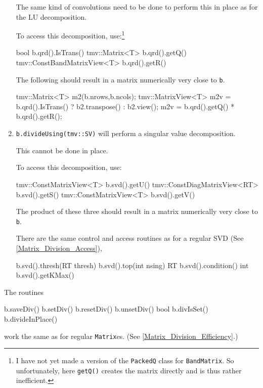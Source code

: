 \documentclass[twoside,letterpaper,11pt]{article}
\renewcommand{\tt}[1]{{\lstinline {#1}}}
\begin{document}
\begin{enumerate}
The same kind of convolutions need to be done to perform this in place as 
for the LU decomposition.

To access this decomposition, use:\footnote{
I have not yet made a version of the \tt{PackedQ} class for \tt{BandMatrix}.
So unfortunately, here \tt{getQ()} creates the matrix directly and is thus
rather inefficient.}
\begin{tmvcode}
bool b.qrd().IsTrans()
tmv::Matrix<T> b.qrd().getQ()
tmv::ConstBandMatrixView<T> b.qrd().getR()
\end{tmvcode}
The following should result in a matrix numerically very close to \tt{b}.
\begin{tmvcode}
tmv::Matrix<T> m2(b.nrows,b.ncols);
tmv::MatrixView<T> m2v = 
      b.qrd().IsTrans() ? b2.transpose() : b2.view();
m2v = b.qrd().getQ() * b.qrd().getR();
\end{tmvcode}

\item
\tt{b.divideUsing(tmv::SV)} will perform a singular value decomposition.

This cannot be done in place.

To access this decomposition, use:
\begin{tmvcode}
tmv::ConstMatrixView<T> b.svd().getU()
tmv::ConstDiagMatrixView<RT> b.svd().getS()
tmv::ConstMatrixView<T> b.svd().getV()
\end{tmvcode}
The product of these three
should result in a matrix numerically very close to \tt{b}.

There are the same control and access routines as for a regular SVD
(See \ref{Matrix_Division_Access}),
\begin{tmvcode}
b.svd().thresh(RT thresh)
b.svd().top(int nsing)
RT b.svd().condition()
int b.svd().getKMax()
\end{tmvcode}

\end{enumerate}
The routines 
\begin{tmvcode}
b.saveDiv()
b.setDiv()
b.resetDiv()
b.unsetDiv()
bool b.divIsSet()
b.divideInPlace()
\end{tmvcode}
work the same as for regular \tt{Matrix}es.
(See \ref{Matrix_Division_Efficiency}.)
\end{document}
